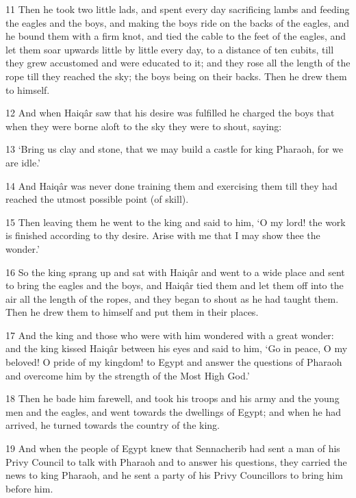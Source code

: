 \par 11 Then he took two little lads, and spent every day sacrificing lambs and feeding the eagles and the boys, and making the boys ride on the backs of the eagles, and he bound them with a firm knot, and tied the cable to the feet of the eagles, and let them soar upwards little by little every day, to a distance of ten cubits, till they grew accustomed and were educated to it; and they rose all the length of the rope till they reached the sky; the boys being on their backs. Then he drew them to himself.

\par 12 And when Haiqâr saw that his desire was fulfilled he charged the boys that when they were borne aloft to the sky they were to shout, saying:

\par 13 ‘Bring us clay and stone, that we may build a castle for king Pharaoh, for we are idle.’

\par 14 And Haiqâr was never done training them and exercising them till they had reached the utmost possible point (of skill).

\par 15 Then leaving them he went to the king and said to him, ‘O my lord! the work is finished according to thy desire. Arise with me that I may show thee the wonder.’

\par 16 So the king sprang up and sat with Haiqâr and went to a wide place and sent to bring the eagles and the boys, and Haiqâr tied them and let them off into the air all the length of the ropes, and they began to shout as he had taught them. Then he drew them to himself and put them in their places.

\par 17 And the king and those who were with him wondered with a great wonder: and the king kissed Haiqâr between his eyes and said to him, ‘Go in peace, O my beloved! O pride of my kingdom! to Egypt and answer the questions of Pharaoh and overcome him by the strength of the Most High God.’

\par 18 Then he bade him farewell, and took his troops and his army and the young men and the eagles, and went towards the dwellings of Egypt; and when he had arrived, he turned towards the country of the king.

\par 19 And when the people of Egypt knew that Sennacherib had sent a man of his Privy Council to talk with Pharaoh and to answer his questions, they carried the news to king Pharaoh, and he sent a party of his Privy Councillors to bring him before him.

